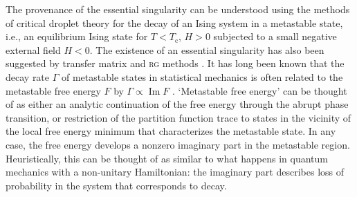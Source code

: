 \documentclass[aps,prl,reprint]{revtex4-1}
\def\im{\mathop{\mathrm{Im}}\nolimits}
\def\c{\mathrm c}
\begin{document}
The provenance of the essential singularity can be understood using the
methods of critical droplet theory for the decay of an Ising system in a
metastable state, i.e., an equilibrium Ising state for $T<T_\c$, $H>0$
subjected to a small negative external field $H<0$. The existence of an
essential singularity has also been suggested by transfer matrix
\cite{mccraw.1978.metastability,enting.1980.investigation} and \textsc{rg}
methods \cite{klein.1976.essential}.  It has long been known that the decay
rate $\Gamma$ of metastable states in statistical mechanics is often related
to the metastable free energy $F$ by $\Gamma\propto\im F$
\cite{langer.1969.metastable,penrose.1987.rigorous,gaveau.1989.analytic,privman.1982.analytic}.
`Metastable free energy' can be thought of as either an analytic continuation
of the free energy through the abrupt phase transition, or restriction of the
partition function trace to states in the vicinity of the local free energy
minimum that characterizes the metastable state. In any case, the free energy
develops a nonzero imaginary part in the metastable region. Heuristically,
this can be thought of as similar to what happens in quantum mechanics with a
non-unitary Hamiltonian: the imaginary part describes loss of probability in
the system that corresponds to decay. 
\end{document}
